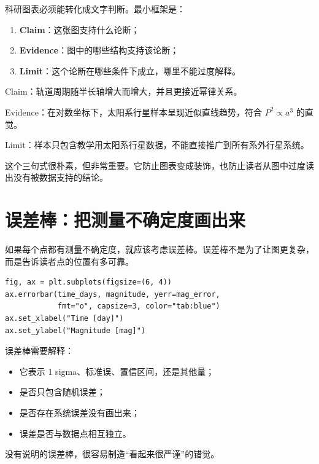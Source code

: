 科研图表必须能转化成文字判断。最小框架是：

\begin{enumerate}
    \item \textbf{Claim}：这张图支持什么论断；
    \item \textbf{Evidence}：图中的哪些结构支持该论断；
    \item \textbf{Limit}：这个论断在哪些条件下成立，哪里不能过度解释。
\end{enumerate}

\begin{examplebox}[行星轨道图的三句式说明]
Claim：轨道周期随半长轴增大而增大，并且更接近幂律关系。

Evidence：在对数坐标下，太阳系行星样本呈现近似直线趋势，符合 \(P^2 \propto a^3\) 的直觉。

Limit：样本只包含教学用太阳系行星数据，不能直接推广到所有系外行星系统。
\end{examplebox}

这个三句式很朴素，但非常重要。它防止图表变成装饰，也防止读者从图中过度读出没有被数据支持的结论。

\section{误差棒：把测量不确定度画出来}

如果每个点都有测量不确定度，就应该考虑误差棒。误差棒不是为了让图更复杂，而是告诉读者点的位置有多可靠。

\begin{examplebox}[最小误差棒图]
\begin{lstlisting}[style=pythonstyle]
fig, ax = plt.subplots(figsize=(6, 4))
ax.errorbar(time_days, magnitude, yerr=mag_error,
            fmt="o", capsize=3, color="tab:blue")
ax.set_xlabel("Time [day]")
ax.set_ylabel("Magnitude [mag]")
\end{lstlisting}
\end{examplebox}

误差棒需要解释：

\begin{itemize}
    \item 它表示 1 sigma、标准误、置信区间，还是其他量；
    \item 是否只包含随机误差；
    \item 是否存在系统误差没有画出来；
    \item 误差是否与数据点相互独立。
\end{itemize}

没有说明的误差棒，很容易制造“看起来很严谨”的错觉。

